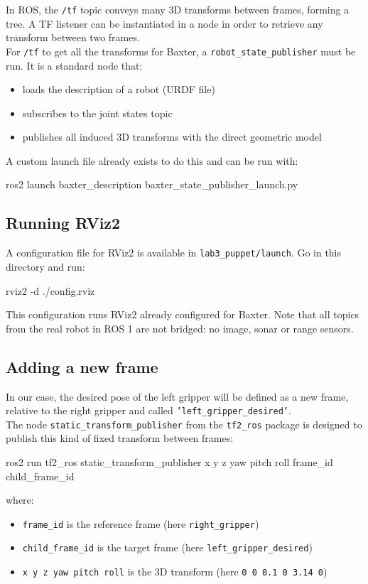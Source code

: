 \documentclass{ecnreport}
\begin{document}
In ROS, the \texttt{/tf} topic conveys many 3D transforms between frames, forming a tree. A TF listener can be instantiated in a node in order to retrieve any transform between two frames. \\

For \texttt{/tf} to get all the transforms for Baxter, a \texttt{robot\_state\_publisher} must be run. It is a standard node that:
\begin{itemize}
 \item loads the description of a robot (URDF file)
 \item subscribes to the joint states topic
 \item publishes all induced 3D transforms with the direct geometric model
\end{itemize}
A custom launch file already exists to do this and can be run with:
\begin{bashcodelarge}
 ros2 launch baxter_description baxter_state_publisher_launch.py
\end{bashcodelarge}

\subsection{Running RViz2}

A configuration file for RViz2 is available in \texttt{lab3\_puppet/launch}. Go in this directory and run:
\begin{bashcodelarge}
rviz2 -d ./config.rviz
\end{bashcodelarge}

This configuration runs RViz2 already configured for Baxter. Note that all topics from the real robot in ROS 1 are not bridged: no image, sonar or range sensors.

\subsection{Adding a new frame}

In our case, the desired pose of the left gripper will be defined as a new frame, relative to the right gripper and called \texttt{'left\_gripper\_desired'}.\\
The node \texttt{static\_transform\_publisher} from the \texttt{tf2\_ros} package is designed to publish this kind of fixed transform between frames:
\begin{bashcodelarge}
 ros2 run tf2_ros static_transform_publisher x y z yaw pitch roll frame_id child_frame_id
\end{bashcodelarge}where:
\begin{itemize}
\item \texttt{frame\_id} is the reference frame (here \texttt{right\_gripper})
\item \texttt{child\_frame\_id} is the target frame (here \texttt{left\_gripper\_desired})
 \item \texttt{x y z yaw pitch roll} is the 3D transform (here \texttt{0 0 0.1 0 3.14 0})
\end{itemize}
\end{document}
